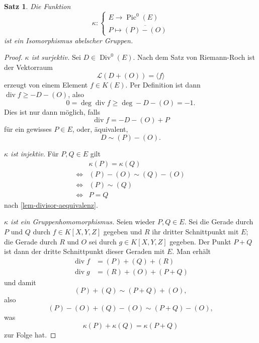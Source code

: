 \documentclass{amsart}
\theoremstyle{plain}
\newtheorem{proposition}[subsection]{Satz}
\theoremstyle{definition}
\newcommand{\pic}{\operatorname{Pic}}
\newcommand{\divgrp}{\operatorname{Div}}
\newcommand{\divop}{\operatorname{div}}
\newcommand{\riemannspace}{\mathcal{L}}
\newcommand{\coset}[1]{\overline{#1}}
\begin{document}
\begin{proposition}
	\label{prop-isomorphism-pic}
	Die Funktion
	\begin{equation*}
		\kappa \colon \begin{cases}
			E \rightarrow \pic^0(E) \\
			P \mapsto \coset{(P) - (O)}
		\end{cases}
	\end{equation*}
	ist ein Isomorphismus abelscher Gruppen.
\end{proposition}
\begin{proof}
	{\it $\kappa$ ist surjektiv.}
	Sei $D \in \divgrp^0(E)$. Nach dem Satz von Riemann-Roch ist der Vektorraum
	\begin{equation*}
		\riemannspace(D + (O)) = \langle f \rangle
	\end{equation*}
	erzeugt von einem Element $f \in K(E)$. Per Definition ist dann $\divop f \geq -D - (O)$, also
	\begin{equation*}
		0 = \deg \divop f \geq \deg -D - (O) = -1.
	\end{equation*}
	Dies ist nur dann möglich, falls
	\begin{equation*}
		\divop f = -D - (O) + P
	\end{equation*}
	für ein gewisses $P \in E$, oder, äquivalent,
	\begin{equation*}
		D \sim (P) - (O).
	\end{equation*}

	{\it $\kappa$ ist injektiv.}
	Für $P, Q \in E$ gilt
	\begin{equation*}
		\begin{array}{ll}
			& \kappa(P) = \kappa(Q) \\
			\Leftrightarrow & (P) - (O) \sim (Q) - (O) \\
			\Leftrightarrow & (P) \sim (Q) \\
			\Leftrightarrow & P = Q
		\end{array}
	\end{equation*}
	nach \ref{lem-divisor-aequivalenz}.

	{\it $\kappa$ ist ein Gruppenhomomorphismus.}
	Seien wieder $P, Q \in E$.
	Sei die Gerade durch $P$ und $Q$ durch $f \in K[X, Y, Z]$ gegeben und $R$ ihr dritter Schnittpunkt mit $E$; die Gerade durch $R$ und $O$ sei durch $g \in K[X, Y, Z]$ gegeben.
	Der Punkt $P + Q$ ist dann der dritte Schnittpunkt dieser Geraden mit $E$.
	Man erhält
	\begin{align*}
		\divop f & = (P) + (Q) + (R) \\
		\divop g & = (R) + (O) + (P + Q)
	\end{align*}
	und damit
	\begin{equation*}
		(P) + (Q) \sim (P + Q) + (O),
	\end{equation*}
	also
	\begin{equation*}
		(P) - (O) + (Q) - (O) \sim (P + Q) - (O),
	\end{equation*}
	was
	\begin{equation*}
		\kappa(P) + \kappa(Q) = \kappa(P + Q)
	\end{equation*}
	zur Folge hat.
\end{proof}
\end{document}
